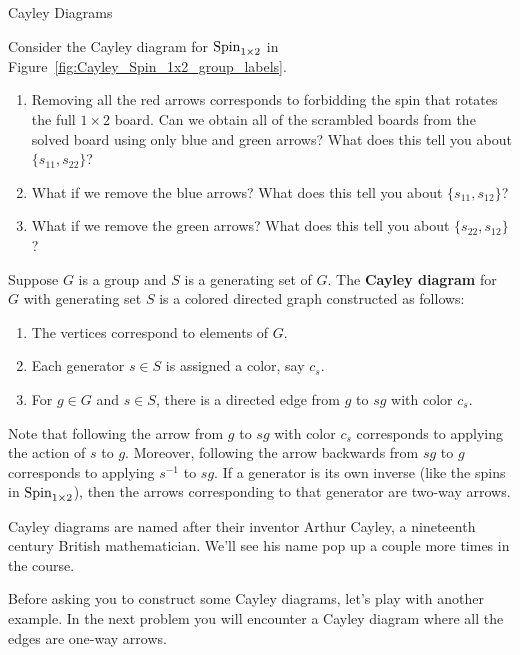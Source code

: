 \begin{section}{Cayley Diagrams}
\begin{problem}
Consider the Cayley diagram for $\operatorname{Spin}_{1\times 2}$ in Figure~\ref{fig:Cayley_Spin_1x2_group_labels}.
\begin{enumerate}[label=\rm{(\alph*)}]
\item Removing all the red arrows corresponds to forbidding the spin that rotates the full $1\times 2$ board. Can we obtain all of the scrambled boards from the solved board using only blue and green arrows? What does this tell you about $\{s_{11},s_{22}\}$?
\item What if we remove the blue arrows? What does this tell you about $\{s_{11},s_{12}\}$?
\item What if we remove the green arrows? What does this tell you about $\{s_{22},s_{12}\}$?
\end{enumerate}
\end{problem}

\begin{definition}
Suppose $G$ is a group and $S$ is a generating set of $G$. The \textbf{Cayley diagram} for $G$ with generating set $S$ is a colored directed graph constructed as follows:
\begin{enumerate}[label=\rm{(\alph*)}]
\item The vertices correspond to elements of $G$.
\item Each generator $s\in S$ is assigned a color, say $c_s$.
\item For $g\in G$ and $s\in S$, there is a directed edge from $g$ to $sg$ with color $c_s$.
\end{enumerate}
\end{definition}

Note that following the arrow from $g$ to $sg$ with color $c_s$ corresponds to applying the action of $s$ to $g$. Moreover, following the arrow backwards from $sg$ to $g$ corresponds to applying $s^{-1}$ to $sg$. If a generator is its own inverse (like the spins in $\operatorname{Spin}_{1\times 2}$), then the arrows corresponding to that generator are two-way arrows.  

Cayley diagrams are named after their inventor Arthur Cayley, a nineteenth century British mathematician.  We'll see his name pop up a couple more times in the course.  

Before asking you to construct some Cayley diagrams, let's play with another example. In the next problem you will encounter a Cayley diagram where all the edges are one-way arrows.


\end{section}
